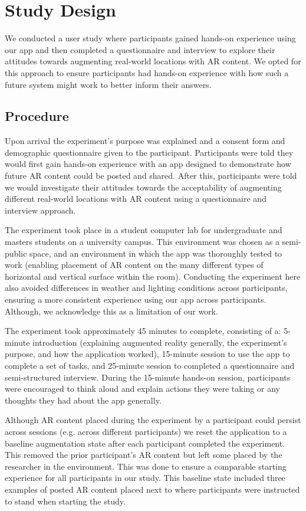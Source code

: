 \section{Study Design}
We conducted a user study where participants gained hands-on experience using our app and then completed a questionnaire and interview to explore their attitudes towards augmenting real-world locations with AR content. 
We opted for this approach to ensure participants had hands-on experience with how such a future system might work to better inform their answers.



\subsection{Procedure}
Upon arrival the experiment’s purpose was explained and a consent form and demographic questionnaire given to the participant.
Participants were told they would first gain hands-on experience with an app designed to demonstrate how future AR content could be posted and shared.
After this, participants were told we would investigate their attitudes towards the acceptability of augmenting different real-world locations with AR content using a questionnaire and interview approach. 

The experiment took place in a student computer lab for undergraduate and masters students on a university campus. 
This environment was chosen as a semi-public space, and an environment in which the app was thoroughly tested to work (enabling placement of AR content on the many different types of horizontal and vertical surface within the room). 
Conducting the experiment here also avoided differences in weather and lighting conditions across participants, ensuring a more consistent experience using our app across participants. 
Although, we acknowledge this as a limitation of our work. 

The experiment took approximately 45 minutes to complete, consisting of a: 5-minute introduction (explaining augmented reality generally, the experiment's purpose, and how the application worked), 15-minute session to use the app to complete a set of tasks, and 25-minute session to completed a questionnaire and semi-structured interview. 
During the 15-minute hands-on session, participants were encouraged to think aloud and explain actions they were taking or any thoughts they had about the app generally. 

Although AR content placed during the experiment by a participant could persist across sessions (e.g. across different participants) we reset the application to a baseline augmentation state after each participant completed the experiment. 
This removed the prior participant's AR content but left some placed by the researcher in the environment. 
This was done to ensure a comparable starting experience for all participants in our study. 
This baseline state included three examples of posted AR content placed next to where participants were instructed to stand when starting the study. 



